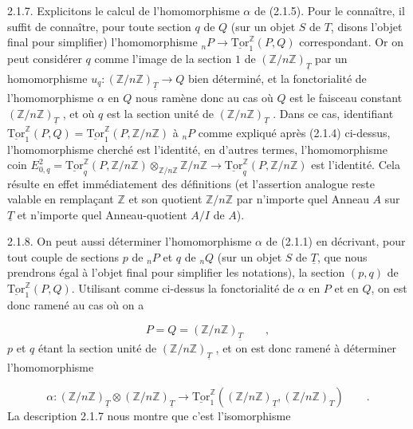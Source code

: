 2.1.7. Explicitons le calcul de l'homomorphisme $\alpha$ de (2.1.5). Pour le connaître, il suffit de connaître, pour toute section $q$ de $Q$ (sur un objet $S$ de $T$, disons l'objet final pour simplifier) l'homomorphisme ${}_nP \longrightarrow \underline{\mathrm{Tor}}_1^{\mathbb{Z}}(P,Q)$ correspondant. Or on peut considérer $q$ comme l'image de la section $1$ de $(\mathbb{Z}/n\mathbb{Z})_{\underline{T}}$ par un homomorphisme $u_q : (\mathbb{Z}/n\mathbb{Z})_{\underline{T}} \longrightarrow Q$ bien déterminé, et la fonctorialité de l'homomorphisme $\alpha$ en $Q$ nous
ramène donc au cas où $Q$ est le faisceau constant $(\mathbb{Z}/n\mathbb{Z})_{\underline{T}}$ , et où $q$ est la section unité de $(\mathbb{Z}/n\mathbb{Z})_{\underline{T}}$ . Dans ce cas, identifiant $\underline{\mathrm{Tor}}_1^{\mathbb{Z}}(P,Q) = \underline{\mathrm{Tor}}_1^{\mathbb{Z}}(P,\mathbb{Z}/n\mathbb{Z})$ à ${}_nP$ comme expliqué après (2.1.4) ci-dessus, l'homomorphisme cherché est l'identité, en d'autres termes, l'homomorphisme coin $E^2_{0,q} = \underline{\mathrm{Tor}}_q^{\mathbb{Z}}(P,\mathbb{Z}/n\mathbb{Z}) \otimes_{\mathbb{Z}/n\mathbb{Z}} \mathbb{Z}/n\mathbb{Z} \longrightarrow \underline{\mathrm{Tor}}_q^{\mathbb{Z}}(P,\mathbb{Z}/n\mathbb{Z})$ est l'identité. Cela résulte en effet immédiatement des définitions (et l'assertion analogue reste valable en remplaçant $\mathbb{Z}$ et son quotient $\mathbb{Z}/n\mathbb{Z}$ par n'importe quel Anneau $A$ sur $\underline{T}$ et n'importe quel Anneau-quotient $A/I$ de $A$).

2.1.8. On peut aussi déterminer l'homomorphisme $\alpha$ de (2.1.1) en décrivant, pour tout couple de sections $p$ de ${}_nP$ et $q$ de ${}_nQ$ (sur un objet $S$ de $\underline{T}$, que nous prendrons égal à l'objet final pour simplifier les notations), la section $(p,q)$ de $\underline{\mathrm{Tor}}_1^{\mathbb{Z}}(P,Q)$. Utilisant comme ci-dessus la fonctorialité de $\alpha$ en $P$ et en $Q$, on est donc ramené au cas où on a

\begin{equation*}
P = Q = (\mathbb{Z}/n\mathbb{Z})_{\underline{T}} \qquad ,
\end{equation*}
$p$ et $q$ étant la section unité de $(\mathbb{Z}/n\mathbb{Z})_{\underline{T}}$ , et on est donc ramené à déterminer l'homomorphisme

\begin{equation*}
\alpha : (\mathbb{Z}/n\mathbb{Z})_{\underline{T}} \otimes (\mathbb{Z}/n\mathbb{Z})_{\underline{T}} \longrightarrow \underline{\mathrm{Tor}}_1^{\mathbb{Z}}((\mathbb{Z}/n\mathbb{Z})_{\underline{T}},(\mathbb{Z}/n\mathbb{Z})_T) \qquad .
\end{equation*}
La description 2.1.7 nous montre que c'est l'isomorphisme

